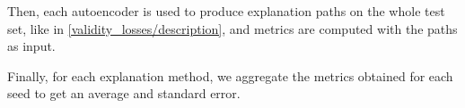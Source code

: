 \documentclass[../main.tex]{subfiles}
\begin{document}
Then, each autoencoder is used to produce explanation paths on the whole test set, like in \autoref{validity_losses/description}, and metrics are computed with the paths as input.

Finally, for each explanation method, we aggregate the metrics obtained for each seed to get an average and standard error.












\end{document}
